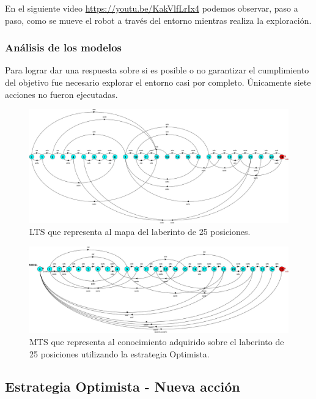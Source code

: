 En el siguiente video \url{https://youtu.be/KakVlfLrIx4} podemos observar, paso a paso, como se mueve el
robot a través del entorno mientras realiza la exploración.

\clearpage

\subsubsection{Análisis de los modelos}

Para lograr dar una respuesta sobre si es posible o no garantizar el cumplimiento del objetivo fue necesario 
explorar el entorno casi por completo. Únicamente siete acciones no fueron ejecutadas.

\begin{figure}[H]
	\centering
		\includegraphics[width=1.0\textwidth]{Imagenes/Laberintos/25_view.jpg}
	\caption{LTS que representa al mapa del laberinto de 25 posiciones.}
	\label{fig:25_view}
\end{figure}

\begin{figure}[H]
	\centering
		\includegraphics[width=1.0\textwidth]{Imagenes/Laberintos/25_knowledge_optimista.jpg}
	\caption{MTS que representa al conocimiento adquirido sobre el laberinto de 25 posiciones utilizando la estrategia Optimista.}
	\label{fig:25_knowledge}
\end{figure}

\clearpage

\subsection{Estrategia Optimista - Nueva acción}

